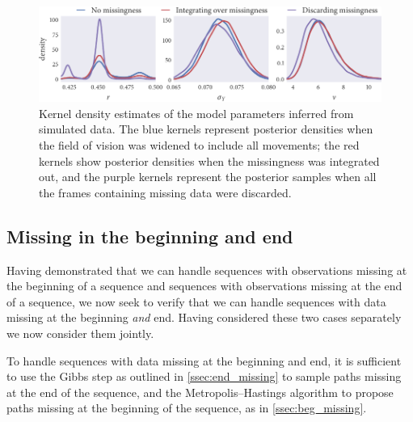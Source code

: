 \begin{figure}
  \includegraphics{end/compare_params.pdf}
  \caption{Kernel density estimates of the model parameters inferred from
  simulated data. The blue kernels represent posterior densities when the
  field of vision was widened to include all movements; the red kernels
  show posterior densities when the missingness was integrated out, and the
  purple kernels represent the posterior samples when all the frames
  containing missing data were discarded.}
  \label{fig:end_compare}
\end{figure}

\subsection{Missing in the beginning and end}

Having demonstrated that we can handle sequences with observations missing at
the beginning of a sequence and sequences with observations missing at the end
of a sequence, we now seek to verify that we can handle sequences with data
missing at the beginning \emph{and} end. Having considered these two cases
separately we now consider them jointly. 

To handle sequences with data missing at the beginning and end, it is
sufficient to use the Gibbs step as outlined in \cref{ssec:end_missing} to
sample paths missing at the end of the sequence, and the Metropolis--Hastings
algorithm to propose paths missing at the beginning of the sequence, as in
\cref{ssec:beg_missing}.

